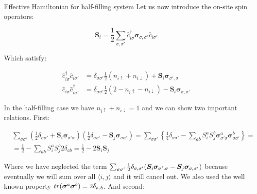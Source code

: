\begin{section}{Effective Hamiltonian for half-filling system}
Let us now introduce the on-site spin operators:

\begin{equation}
\label{SpinOperators}
\boldsymbol{S}_i = \frac{1}{2} \sum_{\sigma, \sigma'} \hat{c}_{i \sigma}^\dagger \boldsymbol{\sigma}_{\sigma, \sigma'} \hat{c}_{i \sigma'}
\end{equation}

Which satisfy:

\begin{align}
\hat{c}_{i \sigma}^\dagger \hat{c}_{i \sigma'} &= \delta_{\sigma \sigma'} \frac{1}{2} (n_{i \uparrow} + n_{i \downarrow}) + \boldsymbol{S}_i\boldsymbol{\sigma}_{\sigma', \sigma} \label{SpinOperatorInv1}\\ 
\hat{c}_{i \sigma} \hat{c}_{i \sigma'}^\dagger &= \delta_{\sigma \sigma'} \frac{1}{2} (2 - n_{i \uparrow} - n_{i \downarrow}) - \boldsymbol{S}_i\boldsymbol{\sigma}_{\sigma, \sigma'} \label{SpinOperatorInv2}
\end{align}

In the half-filling case we have $n_{i \uparrow} + n_{i \downarrow} = 1$ and we can show two important relations. First:

\begin{align*}
&\sum_{\sigma \sigma'} \left(\frac{1}{2}\delta_{\sigma \sigma'} + \boldsymbol{S}_i\boldsymbol{\sigma}_{\sigma' \sigma}\right)\left(\frac{1}{2}\delta_{\sigma \sigma'}-\boldsymbol{S}_j\boldsymbol{\sigma}_{\sigma \sigma'}\right) = \sum_{\sigma \sigma'} \left\{ \frac{1}{4}\delta_{\sigma \sigma'} - \sum_{ab} S_i^aS_j^b 	\boldsymbol{\sigma}_{\sigma'\sigma}^a \boldsymbol{\sigma}_{\sigma \sigma'}^b \right\}= \\
&= \frac{1}{2} - \sum_{ab} S_i^aS_j^b	2\delta_{ab} = \frac{1}{2} - 2\boldsymbol{S}_i\boldsymbol{S}_j
\end{align*}

Where we have neglected the term $\sum_{\sigma \sigma'} \frac{1}{2}\delta_{\sigma,\sigma'}(\boldsymbol{S}_i\boldsymbol{\sigma}_{\sigma',\sigma} - \boldsymbol{S}_j\boldsymbol{\sigma}_{\sigma,\sigma'})$ because eventually we will sum over all $\langle i, j \rangle$ and it will cancel out. We also used the well known property $tr(\boldsymbol{\sigma}^a\boldsymbol{\sigma}^b)=2\delta_{a,b}$. And second:


\end{section}
